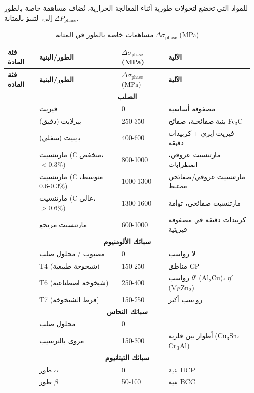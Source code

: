 \documentclass[11pt,a4paper]{article}
\begin{document}
\begin{otherlanguage}{arabic}
		للمواد التي تخضع لتحولات طورية أثناء المعالجة الحرارية، تُضاف مساهمة خاصة بالطور \(\Delta P_{\text{phase}}\) إلى التنبؤ بالمتانة.
		
		\begin{longtable}{p{3.5cm}p{3.0cm}p{3.0cm}p{4cm}}
			\caption{مساهمات خاصة بالطور في المتانة \(\Delta\sigma_{\text{phase}}\) (MPa)} \label{tab:phase-contributions} \\
			\toprule
			\textbf{فئة المادة} & \textbf{الطور/البنية} & \(\Delta\sigma_{\text{phase}}\) (MPa) & \textbf{الآلية} \\
			\midrule
			\endfirsthead
			\toprule
			\textbf{فئة المادة} & \textbf{الطور/البنية} & \(\Delta\sigma_{\text{phase}}\) (MPa) & \textbf{الآلية} \\
			\midrule
			\endhead
			\multicolumn{4}{c}{\textbf{الصلب}} \\
			& فيريت & 0 & مصفوفة أساسية \\
			& بيرلايت (دقيق) & 250-350 & بنية صفائحية، صفائح Fe\(_3\)C \\
			& باينيت (سفلي) & 400-600 & فيريت إبري + كربيدات دقيقة \\
			& مارتنسيت (C منخفض، \(<0.3\%\)) & 800-1000 & مارتنسيت عروقي، اضطرابات \\
			& مارتنسيت (C متوسط، 0.3-0.6\%) & 1000-1300 & مارتنسيت عروقي/صفائحي مختلط \\
			& مارتنسيت (C عالي، \(>0.6\%\)) & 1300-1600 & مارتنسيت صفائحي، توأمة \\
			& مارتنسيت مرتجع & 600-1000 & كربيدات دقيقة في مصفوفة فيريتية \\
			\hline
			\multicolumn{4}{c}{\textbf{سبائك الألومنيوم}} \\
			& مصبوب / محلول صلب & 0 & لا رواسب \\
			& T4 (شيخوخة طبيعية) & 150-250 & مناطق GP \\
			& T6 (شيخوخة اصطناعية) & 250-400 & رواسب \(\theta'\) (Al\(_2\)Cu)، \(\eta'\) (MgZn\(_2\)) \\
			& T7 (فرط الشيخوخة) & 150-250 & رواسب أكبر \\
			\hline
			\multicolumn{4}{c}{\textbf{سبائك النحاس}} \\
			& محلول صلب & 0 & \\
			& مروى بالترسيب & 150-300 & أطوار بين فلزية (Cu\(_3\)Sn، Cu\(_3\)Al) \\
			\hline
			\multicolumn{4}{c}{\textbf{سبائك التيتانيوم}} \\
			& طور \(\alpha\) & 0 & بنية HCP \\
			& طور \(\beta\) & 50-100 & بنية BCC \\

\end{longtable}
\end{otherlanguage}
\end{document}
